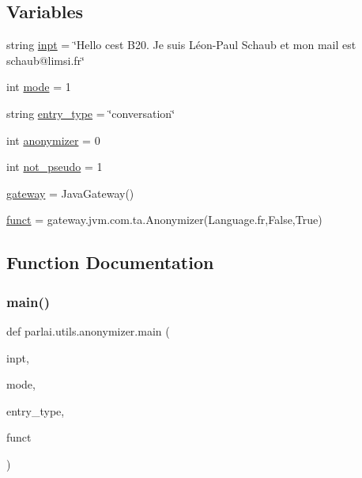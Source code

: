 \subsection*{Variables}
\begin{DoxyCompactItemize}
\item 
string \hyperlink{namespaceparlai_1_1utils_1_1anonymizer_ad5bd5ae637129dc0eb9f5496c1f96ad6}{inpt} = \char`\"{}Hello c\textquotesingle{}est B20. Je suis Léon-\/Paul Schaub et mon mail est schaub@limsi.\+fr\char`\"{}
\item 
int \hyperlink{namespaceparlai_1_1utils_1_1anonymizer_a1afb59b95af0bd5a9921c81690d2d0d5}{mode} = 1
\item 
string \hyperlink{namespaceparlai_1_1utils_1_1anonymizer_aba216f1839606e5e3bda852adf784433}{entry\+\_\+type} = \char`\"{}conversation\char`\"{}
\item 
int \hyperlink{namespaceparlai_1_1utils_1_1anonymizer_a89ccfb2fb740da257af16553e3504175}{anonymizer} = 0
\item 
int \hyperlink{namespaceparlai_1_1utils_1_1anonymizer_a8d5c33a650a9f616ad2133dbe038c59c}{not\+\_\+pseudo} = 1
\item 
\hyperlink{namespaceparlai_1_1utils_1_1anonymizer_ac44caf57d65464ea135b2564bbdbf8cc}{gateway} = Java\+Gateway()
\item 
\hyperlink{namespaceparlai_1_1utils_1_1anonymizer_addfbf956944824344200d1b52b62d2a4}{funct} = gateway.\+jvm.\+com.\+ta.\+Anonymizer(Language.\+fr,False,True)
\end{DoxyCompactItemize}


\subsection{Function Documentation}
\mbox{\label{namespaceparlai_1_1utils_1_1anonymizer_a388eedb16f0bdab16de2cdf114c81ed3}} 
\subsubsection{\texorpdfstring{main()}{main()}}
{\footnotesize\ttfamily def parlai.\+utils.\+anonymizer.\+main (\begin{DoxyParamCaption}\item[{}]{inpt,  }\item[{}]{mode,  }\item[{}]{entry\+\_\+type,  }\item[{}]{funct }\end{DoxyParamCaption})}



